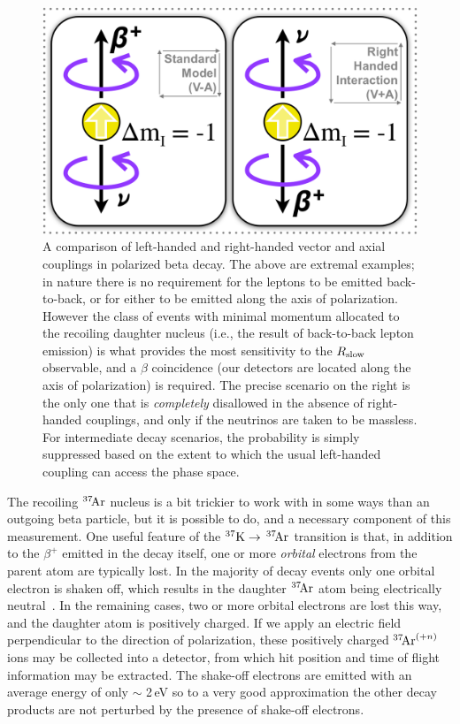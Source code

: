 \begin{figure}[h!t!b!]
	\centering
	\includegraphics[width=.999\linewidth]{Figures/RHC.png}
	\caption[A Comparison of Left-Handed and Right-Handed Couplings]{A comparison of left-handed and right-handed vector and axial couplings in polarized beta decay.  The above are extremal examples;  in nature there is no requirement for the leptons to be emitted back-to-back, or for either to be emitted along the axis of polarization.  However the class of events with minimal momentum allocated to the recoiling daughter nucleus (i.e., the result of back-to-back lepton emission) is what provides the most sensitivity to the $R_{\textrm{slow}}$ observable, and a $\beta$ coincidence (our detectors are located along the axis of polarization) is required.
	The precise scenario on the right is the only one that is \emph{completely} disallowed in the absence of right-handed couplings, and only if the neutrinos are taken to be massless.  For intermediate decay scenarios, the probability is simply suppressed based on the extent to which the usual left-handed coupling can access the phase space.
	\label{fig:rhc}
	}
\end{figure}

The recoiling $^{37}\textrm{\!Ar}$ nucleus is a bit trickier to work with in some ways than an outgoing beta particle, but it is possible to do, and a necessary component of this measurement.  One useful feature of the $^{37}\textrm{K} \rightarrow \,^{37}\textrm{\!Ar}$ transition is that, in addition to the $\beta^+$ emitted in the decay itself, one or more \emph{orbital} electrons from the parent atom are typically lost.  In the majority of decay events only one orbital electron is shaken off, which results in the daughter $^{37}\textrm{\!Ar}$ atom being electrically neutral~\cite{gorelov2000}\cite{dan_thesis}.  In the remaining cases, two or more orbital electrons are lost this way, and the daughter atom is positively charged.  If we apply an electric field perpendicular to the direction of polarization, these positively charged $^{37}\textrm{\!Ar}^{(+n)}$ ions may be collected into a detector, from which hit position and time of flight information may be extracted.  The shake-off electrons are emitted with an average energy of only $\sim$ 2\,eV so to a very good approximation the other decay products are not perturbed by the presence of shake-off electrons\cite{Levinger}.  

